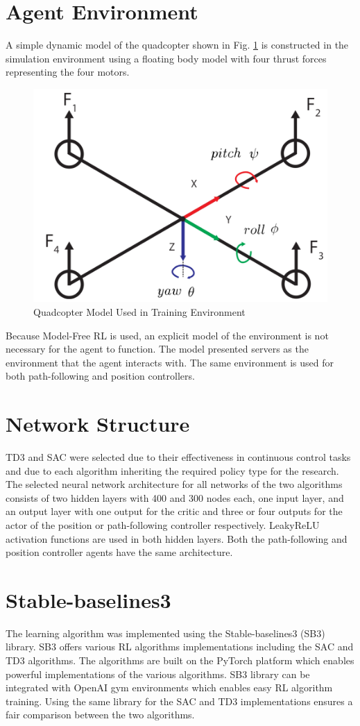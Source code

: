        \section{Agent Environment}
    A simple dynamic model of the quadcopter shown in Fig. \ref{drone model} is constructed in the simulation environment using a floating body model with four thrust forces representing the four motors. 
    \begin{figure}[H]
            \centering
            \includegraphics[width=0.5\linewidth]{Images/drone.png}
            \caption{Quadcopter Model Used in Training Environment \cite{mazen}}
            \label{drone model}
    \end{figure}
    Because Model-Free RL is used, an explicit model of the environment is not necessary for the agent to function. The model presented servers as the environment that the agent interacts with. The same environment is used for both path-following and position controllers.
    \section{Network Structure}
     TD3 and SAC were selected due to their effectiveness in continuous control tasks and due to each algorithm inheriting the required policy type for the research. The selected neural network architecture for all networks of the two algorithms consists of two hidden layers with 400 and 300 nodes each, one input layer, and an output layer with one output for the critic and three or four outputs for the actor of the position or path-following controller respectively. LeakyReLU activation functions are used in both hidden layers. Both the path-following and position controller agents have the same architecture.\clearpage
    \section{Stable-baselines3}
    The learning algorithm was implemented using the Stable-baselines3 (SB3) library. SB3 offers various RL algorithms implementations including the SAC and TD3 algorithms. The algorithms are built on the PyTorch platform which enables powerful implementations of the various algorithms. SB3 library can be integrated with OpenAI gym environments which enables easy RL algorithm training. Using the same library for the SAC and TD3 implementations ensures a fair comparison between the two algorithms.
